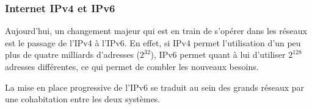 \subsubsection{Internet IPv4 et IPv6}
\par
Aujourd'hui, un changement majeur qui est en train de s'op\'erer dans les r\'eseaux est le passage de l'IPv4 \`a l'IPv6. En effet, si IPv4 permet l'utilisation d'un peu plus de quatre milliards d'adresses ($2^32$), IPv6 permet quant \`a lui d'utiliser $2^128$ adresses diff\'erentes, ce qui permet de combler les nouveaux besoins.
\par
La mise en place progressive de l'IPv6 se traduit au sein des grands r\'eseaux par une cohabitation entre les deux syst\`emes.
% 
